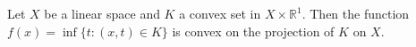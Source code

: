 Let $X$ be a linear space and $K$ a convex set in $X \times \mathbb{R}^1$. Then the function $f(x) = \inf\{t : (x, t) \in K\}$ is convex on the projection of $K$ on $X$.